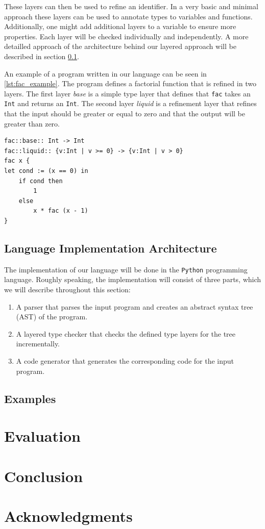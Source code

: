 \documentclass[acmsmall, review, screen]{acmart}
\begin{document}
These layers can then be used to refine an identifier. In a very basic and minimal approach these layers can be used to annotate types to variables and functions. Additionally, one might add additional layers to a variable to ensure more properties. Each layer will be checked individually and independently. A more detailled approach of the architecture behind our layered approach will be described in section \ref{ssec:architecture}.

An example of a program written in our language can be seen in \ref{lst:fac_example}. The program defines a factorial function that is refined in two layers. The first layer \textit{base} is a simple type layer that defines that \texttt{fac} takes an \texttt{Int} and returns an \texttt{Int}. The second layer \textit{liquid} is a refinement layer that refines that the input should be greater or equal to zero and that the output will be greater than zero.

\begin{lstlisting}[caption={Example of a factorial function in our simple language}, label={lst:fac_example}]
fac::base:: Int -> Int
fac::liquid:: {v:Int | v >= 0} -> {v:Int | v > 0}
fac x { 
let cond := (x == 0) in
	if cond then 
		1 
	else 
		x * fac (x - 1) 
}
\end{lstlisting}

\subsection{Language Implementation Architecture}
\label{ssec:architecture}

The implementation of our language will be done in the \texttt{Python} programming language. Roughly speaking, the implementation will consist of three parts, which we will describe throughout this section:

\begin{enumerate}
	\item A parser that parses the input program and creates an abstract syntax tree (AST) of the program.
	\item A layered type checker that checks the defined type layers for the tree incrementally.
	\item A code generator that generates the corresponding code for the input program.
\end{enumerate}



\subsection{Examples}
\label{ssec:examples}

\section{Evaluation}
\label{sec:evaluation}
\section{Conclusion}
\label{sec:conclusion}
\section{Acknowledgments}
\label{sec:acknowledgments}
\end{document}
